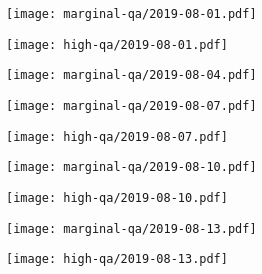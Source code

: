 \documentclass{article}
\begin{document}
\begin{figure}[H]
	\ContinuedFloat
	\centering
	\begin{subfigure}{0.48\linewidth}
		\texttt{[image: marginal-qa/2019-08-01.pdf]}
	\end{subfigure}
	\begin{subfigure}{0.48\linewidth}
		\texttt{[image: high-qa/2019-08-01.pdf]}
	\end{subfigure}
	\begin{subfigure}{\linewidth}
		\hspace{0.25cm}
		\texttt{[image: marginal-qa/2019-08-04.pdf]}
	\end{subfigure}
	\begin{subfigure}{0.48\linewidth}
		\texttt{[image: marginal-qa/2019-08-07.pdf]}
	\end{subfigure}
	\begin{subfigure}{0.48\linewidth}
		\texttt{[image: high-qa/2019-08-07.pdf]}
	\end{subfigure}
	\begin{subfigure}{0.48\linewidth}
		\texttt{[image: marginal-qa/2019-08-10.pdf]}
	\end{subfigure}
	\begin{subfigure}{0.48\linewidth}
		\texttt{[image: high-qa/2019-08-10.pdf]}
	\end{subfigure}
	\begin{subfigure}{0.48\linewidth}
		\texttt{[image: marginal-qa/2019-08-13.pdf]}
	\end{subfigure}
	\begin{subfigure}{0.48\linewidth}
		\texttt{[image: high-qa/2019-08-13.pdf]}
	\end{subfigure}
\end{figure}
\end{document}
